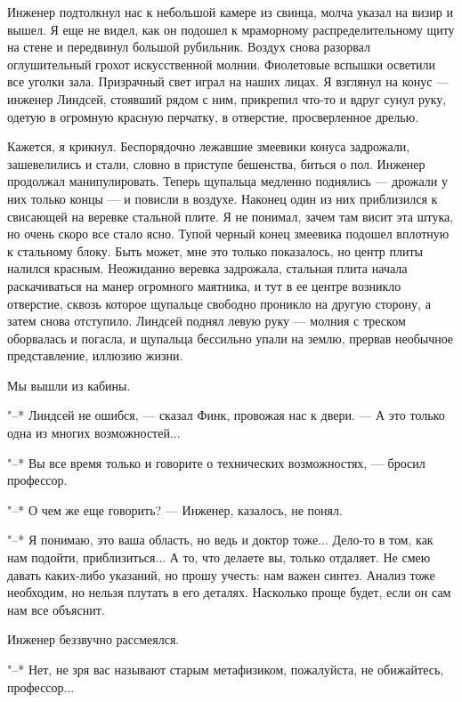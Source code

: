 Инженер подтолкнул нас к небольшой камере из свинца,  молча  указал  на
визир  и  вышел.  Я  еще  не  видел,   как   он   подошел   к   мраморному
распределительному щиту на стене и передвинул  большой  рубильник.  Воздух
снова  разорвал  оглушительный  грохот  искусственной  молнии.  Фиолетовые
вспышки осветили все уголки зала. Призрачный свет играл на наших лицах.  Я
взглянул на конус --- инженер  Линдсей,  стоявший  рядом  с  ним,  прикрепил
что-то  и  вдруг  сунул  руку,  одетую  в  огромную  красную  перчатку,  в
отверстие, просверленное дрелью.

Кажется, я крикнул. Беспорядочно лежавшие  змеевики  конуса  задрожали,
зашевелились и стали, словно в приступе бешенства, биться о  пол.  Инженер
продолжал манипулировать. Теперь щупальца медленно поднялись ---  дрожали  у
них только концы --- и повисли в воздухе. Наконец один из них приблизился  к
свисающей на веревке стальной плите. Я не понимал,  зачем  там  висит  эта
штука, но очень скоро все стало ясно. Тупой черный конец змеевика  подошел
вплотную к стальному блоку. Быть может,  мне  это  только  показалось,  но
центр плиты налился красным. Неожиданно веревка задрожала, стальная  плита
начала раскачиваться на манер  огромного  маятника,  и  тут  в  ее  центре
возникло отверстие, сквозь которое щупальце свободно  проникло  на  другую
сторону, а затем снова отступило. Линдсей поднял левую  руку  ---  молния  с
треском оборвалась и погасла, и щупальца бессильно упали на землю, прервав
необычное представление, иллюзию жизни.

Мы вышли из кабины.

"--* Линдсей не ошибся, --- сказал Финк, провожая  нас  к  двери.  ---  А  это
только одна из многих возможностей...

"--* Вы все время только и говорите о технических возможностях,  ---  бросил
профессор.

"--* О чем же еще говорить? --- Инженер, казалось, не понял.

"--* Я понимаю, это ваша область, но ведь и доктор тоже... Дело-то в  том,
как нам подойти, приблизиться... А то, что делаете вы, только отдаляет. Не
смею давать каких-либо указаний, но прошу учесть: нам важен синтез. Анализ
тоже необходим, но нельзя плутать в его деталях.  Насколько  проще  будет,
если он сам нам все объяснит.

Инженер беззвучно рассмеялся.

"--*  Нет,  не  зря  вас  называют  старым  метафизиком,  пожалуйста,   не
обижайтесь, профессор...

